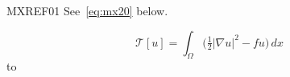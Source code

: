 \documentclass[twocolumn]{article}
\begin{document}
\noindent\mbox{MXREF01} See~\eqref{eq:mx20} below.\par
{}
\begin{wideband}
\begin{equation}\label{eq:mx20}
  \mathcal{T}[u] = \int_{\Omega}\bigl(\tfrac12|\nabla u|^2 - fu\bigr)\,dx
\end{equation}
\noindent\hbox to
\end{wideband}
\end{document}
